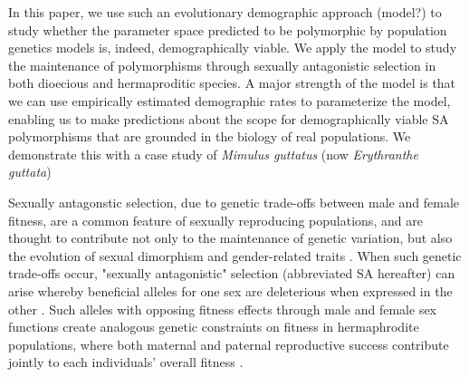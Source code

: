 \documentclass[11pt]{article}
\begin{document}
In this paper, we use such an evolutionary demographic approach (model?) to study whether the parameter space predicted to be polymorphic by population genetics models is, indeed, demographically viable. We apply the model to study the maintenance of polymorphisms through sexually antagonistic selection in both dioecious and hermaproditic species. A major strength of the model is that we can use empirically estimated demographic rates to parameterize the model, enabling us to make predictions about the scope for demographically viable SA polymorphisms that are grounded in the biology of real populations. We demonstrate this with a case study of {\itshape Mimulus guttatus} (now {\itshape Erythranthe guttata})



Sexually antagonstic selection, due to genetic trade-offs between male and female fitness, are a common feature of sexually reproducing populations, and are thought to contribute not only to the maintenance of genetic variation, but also the evolution of sexual dimorphism and gender-related traits \citep{Lande1980, Rice1992, Charlesworth1999, RiceChippindale2001, BondurianskyChenoweth2009,Olito2019}. When such genetic trade-offs occur, "sexually antagonistic" selection (abbreviated SA hereafter) can arise whereby beneficial alleles for one sex are deleterious when expressed in the other \citep{Kidwell1977, Rice1992, ConnallonClark2012}. Such alleles with opposing fitness effects through male and female sex functions create analogous genetic constraints on fitness in hermaphrodite populations, where both maternal and paternal reproductive success contribute jointly to each individuals' overall fitness \citep{LloydWebb1986, WebbLloyd1986, Abbott2011, JordanConnallon2014}. 
\end{document}
